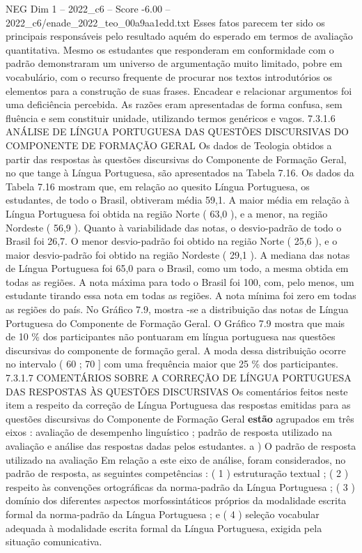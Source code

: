 \begin{textsample}{NEG Dim 1 – 2022\_c6 – Score -6.00 – 2022\_c6/enade\_2022\_teo\_00a9aa1edd.txt}
Esses fatos parecem ter sido os principais responsáveis pelo resultado aquém do esperado em termos de avaliação quantitativa.
Mesmo os estudantes que responderam em conformidade com o padrão demonstraram um universo de argumentação muito limitado, pobre em vocabulário, com o recurso frequente de procurar nos textos introdutórios os elementos para a construção de suas frases.
Encadear e relacionar argumentos foi uma deficiência percebida.
As razões eram apresentadas de forma confusa, sem fluência e sem constituir unidade, utilizando termos genéricos e vagos. 7.3.1.6 ANÁLISE DE LÍNGUA PORTUGUESA DAS QUESTÕES DISCURSIVAS DO COMPONENTE DE FORMAÇÃO GERAL Os dados de Teologia obtidos a partir das respostas às questões discursivas do Componente de Formação Geral, no que tange à Língua Portuguesa, são apresentados na Tabela 7.16.
Os dados da Tabela 7.16 mostram que, em relação ao quesito Língua Portuguesa, os estudantes, de todo o Brasil, obtiveram média 59,1.
A maior média em relação à Língua Portuguesa foi obtida na região Norte ( 63,0 ), e a menor, na região Nordeste ( 56,9 ).
Quanto à variabilidade das notas, o desvio-padrão de todo o Brasil foi 26,7.
O menor desvio-padrão foi obtido na região Norte ( 25,6 ), e o maior desvio-padrão foi obtido na região Nordeste ( 29,1 ).
A mediana das notas de Língua Portuguesa foi 65,0 para o Brasil, como um todo, a mesma obtida em todas as regiões.
A nota máxima para todo o Brasil foi 100, com, pelo menos, um estudante tirando essa nota em todas as regiões.
A nota mínima foi zero em todas as regiões do país.
No Gráfico 7.9, mostra -se a distribuição das notas de Língua Portuguesa do Componente de Formação Geral.
O Gráfico 7.9 mostra que mais de 10 \% dos participantes não pontuaram em língua portuguesa nas questões discursivas do componente de formação geral.
A moda dessa distribuição ocorre no intervalo ( 60 ; 70 ] com uma frequência maior que 25 \% dos participantes. 7.3.1.7 COMENTÁRIOS SOBRE A CORREÇÃO DE LÍNGUA PORTUGUESA DAS RESPOSTAS ÀS QUESTÕES DISCURSIVAS Os comentários feitos neste item a respeito da correção de Língua Portuguesa das respostas emitidas para as questões discursivas do Componente de Formação Geral \textbf{estão} agrupados em três eixos : avaliação de desempenho linguístico ; padrão de resposta utilizado na avaliação e análise das respostas dadas pelos estudantes. a ) O padrão de resposta utilizado na avaliação Em relação a este eixo de análise, foram considerados, no padrão de resposta, as seguintes competências : ( 1 ) estruturação textual ; ( 2 ) respeito às convenções ortográficas da norma-padrão da Língua Portuguesa ; ( 3 ) domínio dos diferentes aspectos morfossintáticos próprios da modalidade escrita formal da norma-padrão da Língua Portuguesa ; e ( 4 ) seleção vocabular adequada à modalidade escrita formal da Língua Portuguesa, exigida pela situação comunicativa.

\end{textsample}
